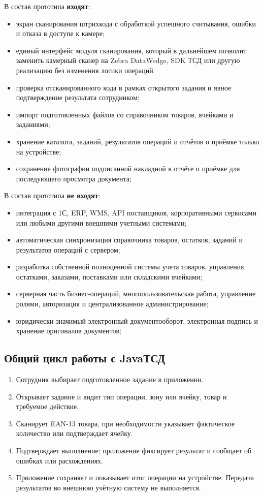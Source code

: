 В состав прототипа \textbf{входят}:

\begin{itemize}
  \item экран сканирования штрихкода с обработкой успешного считывания, ошибки и отказа в доступе к камере;
  \item единый интерфейс модуля сканирования, который в дальнейшем позволит заменить камерный сканер на Zebra DataWedge, SDK ТСД или другую реализацию без изменения логики операций.
  \item проверка отсканированного кода в рамках открытого задания и явное подтверждение результата сотрудником;
  \item импорт подготовленных файлов со справочником товаров, ячейками и заданиями;
  \item хранение каталога, заданий, результатов операций и отчётов о приёмке только на устройстве;
  \item сохранение фотографии подписанной накладной в отчёте о приёмке для последующего просмотра документа;
\end{itemize}

В состав прототипа \textbf{не входят}:

\begin{itemize}
  \item интеграция с 1С, ERP, WMS, API поставщиков, корпоративными сервисами или любыми другими внешними учетными системами;
  \item автоматическая синхронизация справочника товаров, остатков, заданий и результатов операций с сервером;
  \item разработка собственной полноценной системы учета товаров, управления остатками, заказами, поставками или складскими ячейками;
  \item серверная часть бизнес-операций, многопользовательская работа, управление ролями, авторизация и централизованное администрирование;
  \item юридически значимый электронный документооборот, электронная подпись и хранение оригиналов документов;
\end{itemize}


\subsection{Общий цикл работы с JavaТСД}

\begin{enumerate}
  \item Сотрудник выбирает подготовленное задание в приложении.
  \item Открывает задание и видит тип операции, зону или ячейку, товар и требуемое действие.
  \item Сканирует EAN-13 товара, при необходимости указывает фактическое количество или подтверждает ячейку.
  \item Подтверждает выполнение; приложение фиксирует результат и сообщает об ошибках или расхождениях.
  \item Приложение сохраняет и показывает итог операции на устройстве. Передача результатов во внешнюю учётную систему не выполняется.
\end{enumerate}
